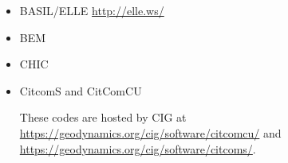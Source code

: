 \begin{itemize}
\item {\codefont BASIL/ELLE} \url{http://elle.ws/}

{\small
\cite{bokj08}
\cite{llor19}
}

\item {\codefont BEM}   

{\small
\cite{crsr83}
\cite{katl95}
\cite{moct07}
\cite{moct09}
\cite{moyb10}
\cite{qumm12}\cite{buqm12}
\cite{quhm13}
\cite{gert19}
}

\item {\codefont CHIC}  

\cite{norv15}

\item {\codefont CitcomS} and {\codefont CitComCU} 

These codes are hosted by CIG at \url{https://geodynamics.org/cig/software/citcomcu/}
and \url{https://geodynamics.org/cig/software/citcoms/}.


\end{itemize}
